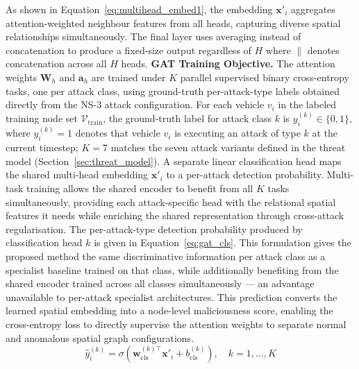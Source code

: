 \documentclass[12pt, a4paper]{report}
\begin{document}
As shown in
Equation~\ref{eq:multihead_embed1}, the embedding $\mathbf{x}'_i$
aggregates attention-weighted neighbour features from all heads,
capturing diverse spatial relationships simultaneously. The final
layer uses averaging instead of concatenation to produce a fixed-size
output regardless of $H$ where $\|$ denotes concatenation across all $H$ heads.
\newline
\newline
\textbf{GAT Training Objective.}
\newline
\newline
The attention weights $\mathbf{W}_h$ and $\mathbf{a}_h$ are trained
under $K$ parallel supervised binary cross-entropy tasks, one per
attack class, using ground-truth per-attack-type labels obtained
directly from the NS-3 attack configuration. For each vehicle $v_i$
in the labeled training node set $\mathcal{V}_{\mathrm{train}}$, the
ground-truth label for attack class $k$ is $y_i^{(k)} \in \{0,1\}$,
where $y_i^{(k)} = 1$ denotes that vehicle $v_i$ is executing an
attack of type $k$ at the current timestep; $K=7$ matches the seven
attack variants defined in the threat model
(Section~\ref{sec:threat_model}). A separate linear classification
head maps the shared multi-head embedding $\mathbf{x}'_i$ to a
per-attack detection probability. Multi-task training allows the
shared encoder to benefit from all $K$ tasks simultaneously, providing
each attack-specific head with the relational spatial features it
needs while enriching the shared representation through cross-attack
regularisation. The per-attack-type detection probability produced by
classification head $k$ is given in Equation~\ref{eq:gat_cls}.
\newline
\newline
This formulation gives the proposed method the same discriminative
information per attack class as a specialist baseline trained on that
class, while additionally benefiting from the shared encoder trained
across all classes simultaneously --- an advantage unavailable to
per-attack specialist architectures.
\newline
\newline
This prediction converts the learned spatial embedding into a
node-level maliciousness score, enabling the cross-entropy loss to
directly supervise the attention weights to separate normal and
anomalous spatial graph configurations.
\begin{equation}
  \hat{y}_i^{(k)} = \sigma\!\left(
    \mathbf{w}_{\mathrm{cls}}^{(k)\top} \mathbf{x}'_i
    + b_{\mathrm{cls}}^{(k)}\right),
    \quad k = 1,\ldots,K
  \label{eq:gat_cls}
\end{equation}
\end{document}

